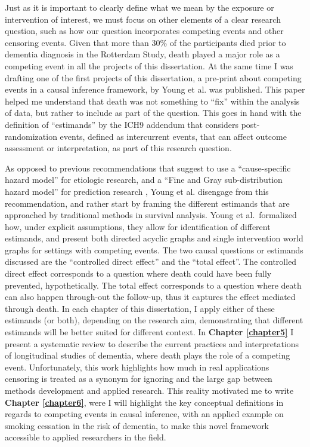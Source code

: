 \documentclass[
]{book}
\begin{document}
Just as it is important to clearly define what we mean by the exposure or intervention of interest, we must focus on other elements of a clear research question, such as how our question incorporates competing events and other censoring events. Given that more than 30\% of the participants died prior to dementia diagnosis in the Rotterdam Study, death played a major role as a competing event in all the projects of this dissertation. At the same time I was drafting one of the first projects of this dissertation, a pre-print about competing events in a causal inference framework, by Young et al. \autocite{young2020} was published. This paper helped me understand that death was not something to ``fix'' within the analysis of data, but rather to include as part of the question. This goes in hand with the definition of ``estimands'' by the ICH9 addendum \autocite{ich9} that considers post-randomization events, defined as intercurrent events, that can affect outcome assessment or interpretation, as part of this research question.

As opposed to previous recommendations that suggest to use a ``cause-specific hazard model'' for etiologic research, and a ``Fine and Gray sub-distribution hazard model'' for prediction research \autocite{lau2009}, Young et al. \autocite{young2020} disengage from this recommendation, and rather start by framing the different estimands that are approached by traditional methods in survival analysis. Young et al.~formalized how, under explicit assumptions, they allow for identification of different estimands, and present both directed acyclic graphs and single intervention world graphs for settings with competing events. The two causal questions or estimands discussed are the ``controlled direct effect'' and the ``total effect''. The controlled direct effect corresponds to a question where death could have been fully prevented, hypothetically. The total effect corresponds to a question where death can also happen through-out the follow-up, thus it captures the effect mediated through death. In each chapter of this dissertation, I apply either of these estimands (or both), depending on the research aim, demonstrating that different estimands will be better suited for different context. In \textbf{Chapter \ref{chapter5}} I present a systematic review to describe the current practices and interpretations of longitudinal studies of dementia, where death plays the role of a competing event. Unfortunately, this work highlights how much in real applications censoring is treated as a synonym for ignoring and the large gap between methods development and applied research. This reality motivated me to write \textbf{Chapter \ref{chapter6}}, were I will highlight the key conceptual definitions in regards to competing events in causal inference, with an applied example on smoking cessation in the risk of dementia, to make this novel framework accessible to applied researchers in the field.
\end{document}
